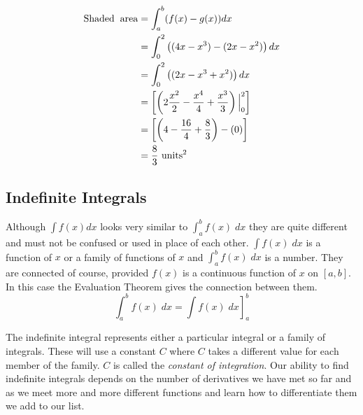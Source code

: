 \begin{multicols}{2}
	\columnbreak
\\	\solution
	\begin{align*}
	\mathrm{Shaded \hspace{0.2cm}area}&=\int_{a}^{b}(f(x)-g(x))dx\\
	&=\int_{0}^{2}\left((4x-x^3)-(2x-x^2)\right)dx\\
	&=\int_{0}^{2}\left((2x-x^3+x^2)\right)dx\\
	&=\left[\left(2\frac{x^2}{2}-\frac{x^4}{4}+\frac{x^3}{3} \right)\Big|_{0}^2\right]\\
	&=\left[\left(4-\frac{16}{4}+\frac{8}{3}\right)-(0)\right]\\
	&=\frac{8}{3} \,\, \mathrm{units}^2
	\end{align*}
\end{multicols}


\subsection*{Indefinite Integrals}
Although $\int f (x) d x$ looks very similar to $\int _{a}^{b}f (x)\; d x$ they are quite different and must not be confused or used in place of each other. $\int f (x)\; d x$ is a function of $x$ or a family of functions of $x$ and $\int _{a}^{b}f (x)\; d x$ is a number. They are connected of course, provided $f (x)$ is a continuous function of $x$ on $\left [a ,b\right ]$. In this case the Evaluation Theorem gives the connection between them.
\begin{equation*}\int _{a}^{b}f (x)\; d x =\left .\int f (x)\; d x\right ]_{a}^{b}
\end{equation*}

The indefinite integral represents either a particular integral or a family of integrals. These will use a constant $C$ where $C$ takes a different value for each member of the family. $C$ is called the \emph{constant of integration}. Our ability to find indefinite integrals depends on the number of derivatives we have met so far and as we meet more and more different functions and learn how to differentiate them we add to our list. 

